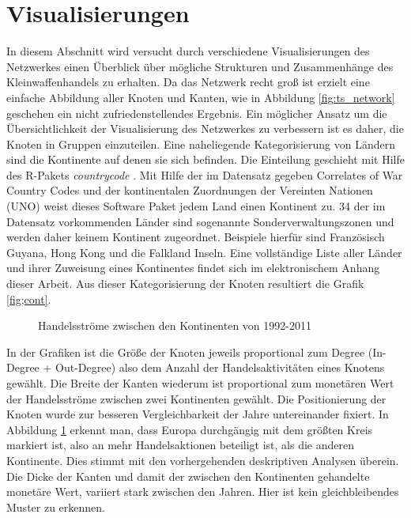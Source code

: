 \documentclass[a4paper,ngerman,oneside,titlepage,bibliography=totoc,11pt]{scrreprt}
\begin{document}
\newpage
\section{Visualisierungen}



In diesem Abschnitt wird versucht durch verschiedene Visualisierungen des Netzwerkes einen Überblick über mögliche Strukturen und Zusammenhänge des Kleinwaffenhandels zu erhalten. Da das Netzwerk recht groß ist erzielt eine einfache Abbildung aller Knoten und Kanten, wie in Abbildung \ref{fig:ts_network} geschehen ein nicht zufriedenstellendes Ergebnis. Ein möglicher Ansatz um die Übersichtlichkeit der Visualisierung des Netzwerkes zu verbessern ist es daher, die Knoten in Gruppen einzuteilen. Eine naheliegende Kategorisierung von Ländern sind die Kontinente auf denen sie sich befinden. Die Einteilung geschieht mit Hilfe des R-Pakets \emph{countrycode} \citep{countrycode}. Mit Hilfe der im Datensatz gegeben Correlates of War Country Codes und der kontinentalen Zuordnungen der Vereinten Nationen (UNO) weist dieses Software Paket jedem Land einen Kontinent zu. 34 der im Datensatz vorkommenden Länder sind sogenannte Sonderverwaltungszonen und werden daher keinem Kontinent zugeordnet. Beispiele hierfür sind Französisch Guyana, Hong Kong und die Falkland Inseln. Eine vollständige Liste aller Länder und ihrer Zuweisung eines Kontinentes findet sich im elektronischem Anhang dieser Arbeit.
Aus dieser Kategorisierung der Knoten resultiert die Grafik \ref{fig;cont}. 


\begin{figure}[ht]
\centering
{}
\caption{Handelsströme zwischen den Kontinenten von 1992-2011}
\label{fig:cont}
\end{figure}
In der Grafiken ist die Größe der Knoten jeweils proportional zum Degree (In-Degree + Out-Degree) also dem Anzahl der Handelsaktivitäten eines Knotens gewählt. Die Breite der Kanten wiederum ist proportional zum monetären Wert der Handelsströme zwischen zwei Kontinenten gewählt. Die Positionierung der Knoten wurde zur besseren Vergleichbarkeit der Jahre untereinander fixiert.
In Abbildung \ref{fig:cont} erkennt man, dass Europa durchgängig mit dem größten Kreis markiert ist, also an mehr Handelsaktionen beteiligt ist, als die anderen Kontinente. Dies stimmt mit den vorhergehenden deskriptiven Analysen überein. Die Dicke der Kanten und damit der zwischen den Kontinenten gehandelte monetäre Wert, variiert stark zwischen den Jahren. Hier ist kein gleichbleibendes Muster zu erkennen.
\end{document}
